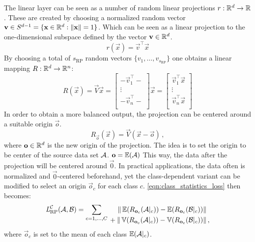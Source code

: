 The linear layer can be seen as a number of random linear projections $r: \mathbb{R}^d \to \mathbb{R}$.
These are created by choosing a normalized random vector $\mathbf v \in S^{d-1} = \{\mathbf x \in \mathbb{R}^d : \|\mathbf x\| = 1\}$.
Which can be seen as a linear projection to the one-dimensional subspace defined by the vector $\mathbf v \in \mathbb{R}^d$.
\[
    r(\vec x) = \vec v ^\top \vec x
\]
By choosing a total of $s_\text{RP}$ random vectors $\{v_1, \dots, v_{s_\text{RP}}\}$ one obtains a linear mapping $R: \mathbb{R}^d \to \mathbb{R}^n$:
\[
    R(\vec x) = \vec V \vec x =
    \begin{bmatrix}
        - \vec v_1 ^\top - \\
        \vdots \\
        - \vec v_n ^\top - \\
    \end{bmatrix}
    \vec x =
    \begin{bmatrix}
        \vec v_1 ^\top \vec x \\
        \vdots \\
        \vec v_n ^\top \vec x \\
    \end{bmatrix}
\]
%
In order to obtain a more balanced output,
the projection can be centered around a suitable origin $\vec o$.
% 
\[
    R_{\vec o} (\vec x) = \vec V (\vec x - \vec o) \,,
\]
where $\mathbf o \in \mathbb{R}^d$ is the new origin of the projection. 
The idea is to set the origin to be center of the source data set $\mathcal A$. $\mathbf o = \operatorname{\mathbb{E}} (\mathcal A)$
This way, the data after the projection will be centered around $\vec 0$.
In practical applications, the data often is normalized and $\vec 0$-centered beforehand,
yet the class-dependent variant can be modified to select an origin $\vec o_c$ for each class $c$.
\cref{eqn:class_statistics_loss} then becomes:
% 
\begin{equation*}
    \textit{L} _{\text{RP}} ^{\mathcal C} (\mathcal A, \mathcal B) =
    \sum _{c = 1, \dots, C}
    \begin{alignedat}[t]{1}
        \|\operatorname{\mathbb{E}} ({R_{\mathbf o_c} (\mathcal A|_c)}) - \operatorname{\mathbb{E}} ({R_{\mathbf o_c} (\mathcal B|_c)}) &\| \\
        {} + \|\operatorname{\mathbb{V}} ({R_{\mathbf o_c} (\mathcal A|_c)}) - \operatorname{\mathbb{V}} ({R_{\mathbf o_c} (\mathcal B|_c)}) &\|  \,,
    \end{alignedat}
\end{equation*}
%
where $\vec o_c$ is set to the mean of each class $\operatorname{\mathbb{E}} ({\mathcal A|_c})$.


